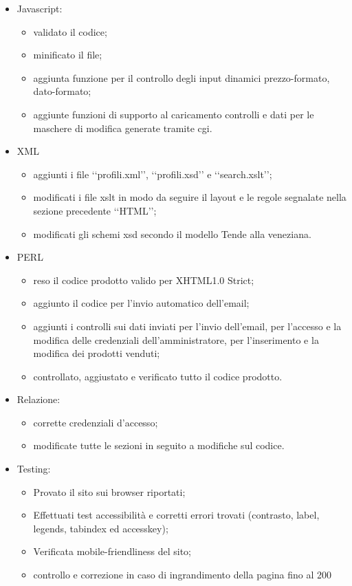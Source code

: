 {\begin{itemize}
\begin{itemize}
			\item creazione del foglio di stile dedicato al browser Internet Explorer.
		\end{itemize}
		\item Javascript:
		\begin{itemize}\itemsep1pt
			\item validato il codice;
			\item minificato il file;
			\item aggiunta funzione per il controllo degli input dinamici prezzo-formato, dato-formato;
			\item aggiunte funzioni di supporto al caricamento controlli e dati per le maschere di modifica generate tramite cgi.
		\end{itemize}
		\item XML
		\begin{itemize}\itemsep1pt
			\item aggiunti i file ‘‘profili.xml’’, ‘‘profili.xsd’’ e ‘‘search.xslt’’;
			\item modificati i file xslt in modo da seguire il layout e le regole segnalate nella sezione precedente ‘‘HTML’’;
			\item modificati gli schemi xsd secondo il modello Tende alla veneziana.
		\end{itemize}
		\item PERL
		\begin{itemize}\itemsep1pt
			\item reso il codice prodotto valido per XHTML1.0 Strict;
			\item aggiunto il codice per l'invio automatico dell'email;
			\item aggiunti i controlli sui dati inviati per l'invio dell'email, per l'accesso e la modifica delle credenziali dell'amministratore, per l'inserimento e la modifica dei prodotti venduti;
			\item controllato, aggiustato e verificato tutto il codice prodotto.
		\end{itemize}
		\item Relazione: 
		\begin{itemize}\itemsep1pt
			\item corrette credenziali d'accesso;
			\item modificate tutte le sezioni in seguito a modifiche sul codice.
		\end{itemize}
		\item Testing:
		\begin{itemize}\itemsep1pt
			\item Provato il sito sui browser riportati;
			\item Effettuati test accessibilità e corretti errori trovati (contrasto, label, legends, tabindex ed accesskey);
			\item Verificata mobile-friendliness del sito;
			\item controllo e correzione in caso di ingrandimento della pagina fino al 200%
		\end{itemize}
	\end{itemize}
}